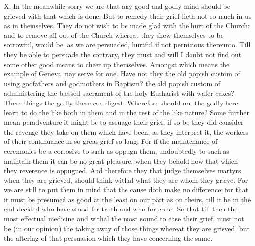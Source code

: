 X. In the meanwhile sorry we are that any good and godly mind should be grieved with that which is done. But to remedy their grief lieth not so much in us as in themselves. They do not wish to be made glad with the hurt of the Church: and to remove all out of the Church whereat they shew themselves to be sorrowful, would be, as we are persuaded, hurtful if not pernicious thereunto. Till they be able to persuade the contrary, they must and will I doubt not find out some other good means to cheer up themselves. Amongst which means the example of Geneva may serve for one. Have not they the old popish custom of using godfathers and godmothers in Baptism? the old popish custom of administering the blessed sacrament of the holy Eucharist with wafer-cakes? These things the godly there can digest. Wherefore should not the godly here learn to do the like both in them and in the rest of the like nature? Some further mean peradventure it might be to assuage their grief, if so be they did consider the revenge they take on them which have been, as they interpret it, the workers of their continuance in so great grief so long. For if the maintenance of ceremonies be a corrosive to such as oppugn them, undoubtedly to such as maintain them it can be no great pleasure, when they behold how that which they reverence is oppugned. And therefore they that judge themselves martyrs when they are grieved, should think withal what they are whom they grieve. For we are still to put them in mind that the cause  doth make no difference; for that it must be presumed as good at the least on our part as on theirs, till it be in the end decided who have stood for truth and who for error. So that till then the most effectual medicine and withal the most sound to ease their grief, must not be (in our opinion) the taking away of those things whereat they are grieved, but the altering of that persuasion which they have concerning the same.

